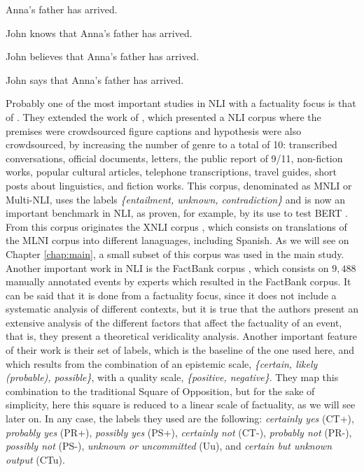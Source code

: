 \begin{exe}
  \ex
    \begin{xlist}
          \item Anna's father has arrived. \label{ex:verfac1a}
          \item John knows that Anna's father has arrived. \label{ex:verfac1b}
          \item John believes that Anna's father has arrived. \label{ex:verfac1c}
          \item John says that Anna's father has arrived. \label{ex:verfac1d}
        \end{xlist}
\end{exe}

Probably one of the most important studies in NLI with a factuality focus is that of \citet{williams2017broad}. They extended the work of \citet{bowman2015large}, which presented a NLI corpus where the premises were crowdsourced figure captions and hypothesis were also crowdsourced, by increasing the number of genre to a total of 10: transcribed conversations, official documents, letters, the public report of 9/11, non-fiction works, popular cultural articles, telephone transcriptions, travel guides, short posts about linguistics, and fiction works. This corpus, denominated as MNLI or Multi-NLI, uses the labels \textit{\{entailment, unknown, contradiction\}} and is now an important benchmark in NLI, as proven, for example, by its use to test BERT \citep{devlin2018bert}. From this corpus originates the XNLI corpus \citep{conneau2018xnli}, which consists on translations of the MLNI corpus into different lanaguages, including Spanish. As we will see on Chapter \ref{chap:main}, a small subset of this corpus was used in the main study.\\

Another important work in NLI is the FactBank corpus \citep{sauri2009factbank}, which consists on $9,488$ manually annotated events by experts which resulted in the FactBank corpus. It can be said that it is done from a factuality focus, since it does not include a systematic analysis of different contexts, but it is true that the authors present an extensive analysis of the different factors that affect the factuality of an event, that is, they present a theoretical veridicality analysis. Another important feature of their work is their set of labels, which is the baseline of the one used here, and which results from the combination of an epistemic scale, \textit{\{certain, likely (probable), possible\}}, with a quality scale, \textit{\{positive, negative\}}. They map this combination to the traditional Square of Opposition, but for the sake of simplicity, here this square is reduced to a linear scale of factuality, as we will see later on. In any case, the labels they used are the following: \textit{certainly yes} (CT+), \textit{probably yes} (PR+), \textit{possibly yes} (PS+), \textit{certainly not} (CT-), \textit{probably not} (PR-), \textit{possibly not} (PS-), \textit{unknown or uncommitted} (Uu), and \textit{certain but unknown output} (CTu).\\

